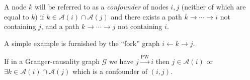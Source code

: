 \documentclass[12pt]{article}
\def\pwgc{\overset{\text{PW}}{\rightarrow}}  %
\def\gcg{\mathcal{G}}  %
\newcommand{\anc}[1]{\mathcal{A}(#1)}  %
\newcommand{\gcgpath}[2]{#1 \rightarrow \cdots \rightarrow #2}  %
\begin{document}
\begin{definition}[Confounder]
  A node $k$ will be referred to as a \textit{confounder} of nodes
  $i, j$ (neither of which are equal to $k$) if
  $k \in \anc{i} \cap \anc{j}$ and there exists a path
  $\gcgpath{k}{i}$ not containing $j$, and a path $\gcgpath{k}{j}$
  not containing $i$.

  A simple example is furnished by the ``fork'' graph
  $i \leftarrow k \rightarrow j$.
\end{definition}

\begin{proposition}
  \label{prop:ancestor_properties}
  If in a Granger-causality graph $\gcg$ we have $j \pwgc i$ then
  $j \in \anc{i}$ or $\exists k \in \anc{i} \cap\anc{j}$ which is a
  confounder of $(i, j)$.
\end{proposition}
\end{document}
